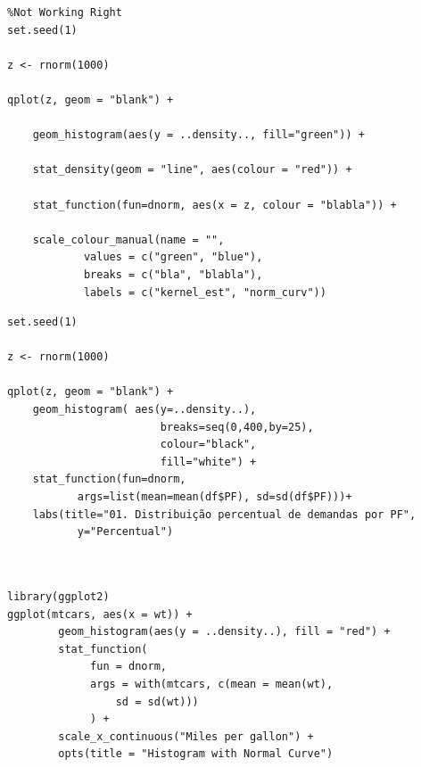 \documentclass[]{article}
\begin{document}
\newpage
\begin{framed}
\begin{verbatim}
%Not Working Right
set.seed(1)

z <- rnorm(1000)

qplot(z, geom = "blank") + 

    geom_histogram(aes(y = ..density.., fill="green")) + 

    stat_density(geom = "line", aes(colour = "red")) + 

    stat_function(fun=dnorm, aes(x = z, colour = "blabla")) + 

    scale_colour_manual(name = "", 
            values = c("green", "blue"), 
            breaks = c("bla", "blabla"), 
            labels = c("kernel_est", "norm_curv"))
\end{verbatim}
\end{framed}
\newpage
\begin{framed}
\begin{verbatim}
set.seed(1)

z <- rnorm(1000)

qplot(z, geom = "blank") + 
    geom_histogram( aes(y=..density..),
                        breaks=seq(0,400,by=25), 
                        colour="black", 
                        fill="white") +
    stat_function(fun=dnorm, 
           args=list(mean=mean(df$PF), sd=sd(df$PF)))+
    labs(title="01. Distribuição percentual de demandas por PF",
           y="Percentual") 
\end{verbatim}
\end{framed}

\newpage
\begin{framed}
\begin{verbatim}


library(ggplot2) 
ggplot(mtcars, aes(x = wt)) + 
        geom_histogram(aes(y = ..density..), fill = "red") + 
        stat_function( 
             fun = dnorm, 
             args = with(mtcars, c(mean = mean(wt), 
                 sd = sd(wt))) 
             ) + 
        scale_x_continuous("Miles per gallon") + 
        opts(title = "Histogram with Normal Curve") 
        
\end{verbatim}
\end{framed}
        
\end{document}
